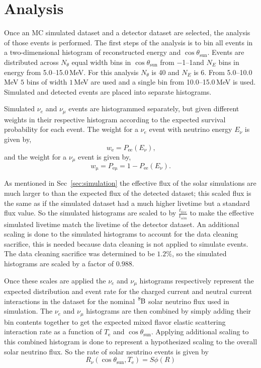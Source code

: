 \section{Analysis}
Once an MC simulated dataset and a detector dataset are selected, the analysis
of those events is performed.
The first steps of the analysis is to bin all events
in a two-dimensional histogram of reconstructed energy and $\cos\theta_{\mathrm{sun}}$.
Events are distributed across $N_{\theta}$ equal width bins in $\cos\theta_{\mathrm{sun}}$ from
\numrange{-1}{1}and
$N_{E}$ bins in energy from \numrange{5.0}{15.0}\,MeV.
For this analysis $N_{\theta}$ is 40 and $N_{E}$ is 6.
From \numrange{5.0}{10.0}\,MeV $5$ bins of width $1$\,MeV are used and
a single bin from \numrange{10.0}{15.0}\,MeV is used.
Simulated and detected events are placed into separate histograms.

Simulated $\nu_{e}$ and $\nu_{\mu}$ events are histogrammed separately,
but given different weights in their respective histogram according to the expected survival probability
for each event.
The weight for a $\nu_{e}$ event with neutrino energy $E_{\nu}$ is given by,
\begin{equation}
    w_{\mathrm{e}} = P_{\mathrm{ee}}(E_{\nu})\text{,}
\end{equation}
and the weight for a $\nu_{\mu}$ event is given by,
\begin{equation}
    w_{\mathrm{\mu}}= P_{\mathrm{e\mu}} = 1 - P_{\mathrm{ee}}(E_{\nu})\text{.}
\end{equation}

As mentioned in Sec~\ref{sec:simulation} the effective flux of the solar
simulations are much larger to than the expected flux of the detected dataset;
this scaled flux is the same as if the simulated dataset had a much higher livetime
but a standard flux value.
So the simulated histograms are
scaled to by $\frac{t_{live}}{t_{sim}}$ to make the effective simulated
livetime match the livetime of the detector dataset.
An additional scaling is done to the simulated histograms to account
for the data cleaning sacrifice, this is needed because data cleaning
is not applied to simulate events.
The data cleaning sacrifice was determined to be $1.2\%$, so the
simulated histograms are scaled by a factor of $0.988$.

Once these scales are applied the $\nu_{e}$ and $\nu_{\mu}$ histograms
respectively  represent the expected distribution and event rate for the charged current
and neutral current interactions in the dataset for the nominal $\ce{^{8}B}$
solar neutrino flux used in simulation.
The $\nu_{e}$ and $\nu_{\mu}$ histograms are then combined by
simply adding their bin contents together to get the expected
mixed flavor elastic scattering interaction rate as a function
of $T_{\mathrm{e}}$ and $\cos\theta_{\mathrm{sun}}$.
Applying additional scaling to this combined histogram is done to represent
a hypothesized scaling to the overall solar neutrino flux.
So the rate of solar neutrino events is given by
\begin{equation}
    R_{\nu}(\cos\theta_{\mathrm{sun}}, T_{\mathrm{e}}) =
    S\phi(R)
    \label{eqn:solar_rate}
\end{equation}

